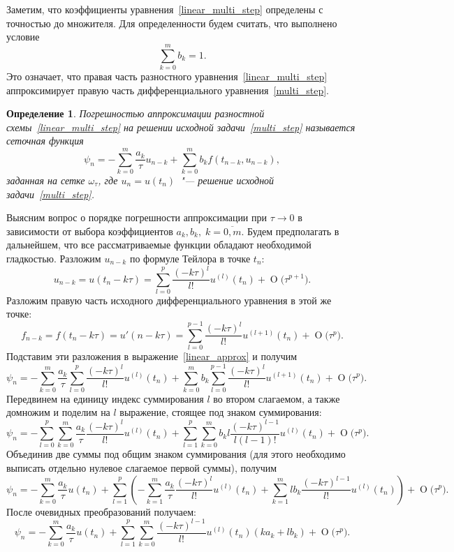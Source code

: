 \documentclass[11pt,a4paper,twoside]{report}
\numberwithin{equation}{section}
\newtheorem*{definition}{Определение}
\theoremstyle{definition}
\theoremstyle{plain}
\newcommand{\bigO}[1]{\ensuremath{\operatorname{O}\bigl(#1\bigr)}}
\begin{document}
Заметим, что коэффициенты уравнения~\eqref{linear_multi_step} определены с
точностью до множителя. Для определенности будем считать, что
выполнено условие
%
$$
    \sum_{k=0}^m b_k=1.
$$
%
Это означает, что правая часть разностного уравнения~\eqref{linear_multi_step}
аппроксимирует правую часть дифференциального уравнения~\eqref{multi_step}.
%
\begin{definition}
%
    Погрешностью аппроксимации разностной схемы~\eqref{linear_multi_step}
    на решении исходной задачи~\eqref{multi_step} называется сеточная функция
    \begin{equation}
        \label{linear_approx}
        \psi_n = -\sum_{k=0}^m\frac{a_k}{\tau}u_{n-k}+\sum_{k=0}^m b_k
        f(t_{n-k},u_{n-k}),
    \end{equation}
    заданная на сетке $\omega_\tau$, где $u_n=u(t_n)$~"--- решение исходной задачи~\eqref{multi_step}.
%
\end{definition}
%

Выясним вопрос о порядке погрешности аппроксимации при $\tau \to 0$ в зависимости
от выбора коэффициентов $a_k, b_k,\;k=\overline{0, m}$.
Будем предполагать в дальнейшем, что все рассматриваемые функции обладают необходимой
гладкостью. Разложим $u_{n-k}$ по формуле Тейлора в точке $t_n$:
%
$$
    u_{n-k} = u(t_n-k\tau) = \sum_{l=0}^p \dfrac{(-k\tau)^l}{l!}
    u^{(l)}(t_n) + \bigO{\tau^{p+1}}.
$$
%
Разложим правую часть исходного дифференциального уравнения в этой же точке:
%
$$
    f_{n-k} = f(t_n - k\tau) = u'(n-k\tau)
    = \sum_{l=0}^{p-1} \dfrac{(-k\tau)^l}{l!}
    u^{(l+1)}(t_n) + \bigO{\tau^p}.
$$
%
Подставим эти разложения в выражение~\eqref{linear_approx} и получим
%
$$
    \psi_n = - \sum_{k=0}^m \dfrac{a_k}{\tau} \sum_{l=0}^p \dfrac{(-k\tau)^l}
    {l!} u^{(l)}(t_n) + \sum_{k=0}^m b_k \sum_{l=0}^{p-1} \dfrac{(-k\tau)^l}
    {l!} u^{(l+1)}(t_n) + \bigO{\tau^p}.
$$
%
Передвинем на единицу индекс суммирования $l$ во втором слагаемом, а также домножим
и поделим на $l$ выражение, стоящее под знаком суммирования:
%
$$
    \psi_n = - \sum_{l=0}^p \sum_{k=0}^m \dfrac{a_k}{\tau} \dfrac{(-k\tau)^l}{l!}
    u^{(l)}(t_n) + \sum_{l=1}^p \sum_{k=0}^m b_kl \dfrac{(-k\tau)^{l-1}}
    {l(l-1)!} u^{(l)}(t_n) + \bigO{\tau^p}.
$$
%
Объединив две суммы под общим знаком суммирования (для этого
необходимо выписать отдельно нулевое слагаемое первой суммы), получим
%
$$
    \psi_n = - \sum_{k=0}^m \dfrac{a_k}{\tau} u(t_n) + \sum \limits_{l=1}^p
    \left(-\sum_{k=1}^m \dfrac{a_k}{\tau} \dfrac{(-k\tau)^l}{l!} u^{(l)}(t_n)
     + \sum_{k=1}^m lb_k \dfrac{(-k\tau)^{l-1}}{l!} u^{(l)}(t_n)\right) +\bigO{\tau^p}.
$$
%
После очевидных преобразований получаем:
%
$$
    \psi_n = - \sum_{k=0}^m \dfrac{a_k}{\tau} u(t_n) + \sum_{l=1}^p \sum_{k=0}^m
     \dfrac{(-k\tau)^{l-1}}{l!} u^{(l)}(t_n) (ka_k + lb_k) + \bigO{\tau^p}.
$$
%
\end{document}
